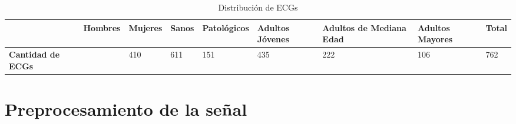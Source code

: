 \documentclass[12pt,letterpaper,oneside,openright]{book}
\begin{document}
\begin{table}[ht]
	\renewcommand{\arraystretch}{2}
	\begin{center}
		\begin{tabular}{|p{1.85cm}|M{1.7cm}|M{1.55cm}|M{1.15cm}|M{2.2cm}|M{1.5cm}|M{1.5cm}|M{1.5cm}|M{1cm}|}
			\hline
			& \textbf{Hombres} & \textbf{Mujeres} & \textbf{Sanos} & \textbf{Patológicos} & \textbf{Adultos Jóvenes} & \textbf{Adultos de Mediana Edad} & \textbf{Adultos Mayores} & \textbf{Total} \\
			\hline
			\textbf{Cantidad de ECGs} &  & 410 & 611 & 151 & 435 & 222 & 106 & 762 \\
			\hline
		\end{tabular}
		\caption{Distribución de ECGs}
		\label{tab:distriECGs}
	\end{center}
\end{table}


\section{Preprocesamiento de la señal}
	
\end{document}
